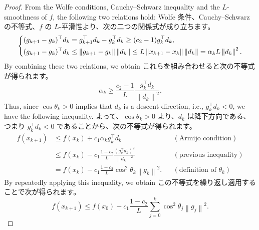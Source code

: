 \documentclass[0_main]{subfiles}
\begin{document}
\begin{proof}
    \ifEn
        From the Wolfe conditions, Cauchy--Schwarz inequality and the $L$-smoothness of $f$, the following two relations hold:
    \else
        Wolfe 条件、Cauchy--Schwarzの不等式、$f$ の $L$-平滑性より、次の二つの関係式が成り立ちます。
    \fi
    \begin{equation*}
        \begin{dcases}
            (g_{k+1} - g_k)^\top d_k = g_{k+1}^\top d_k - g_k^\top d_k
            \geq (c_2 - 1) g_k^\top d_k, \\
            (g_{k+1} - g_k)^\top d_k \leq
            \left\lVert g_{k+1} - g_k \right\rVert \left\lVert d_k \right\rVert \leq L \left\lVert x_{k+1} - x_k \right\rVert \left\lVert d_k \right\rVert  = \alpha_k L \left\lVert d_k \right\rVert^2.
        \end{dcases}
    \end{equation*}
    \ifEn
        By combining these two relations, we obtain
    \else
        これらを組み合わせると次の不等式が得られます。
    \fi
    \begin{equation*}
        \alpha_k \geq \frac{c_2 - 1}{L} \frac{g_k^\top d_k}{\left\lVert d_k \right\rVert^2}.
    \end{equation*}
    \ifEn
        Thus, since $\cos \theta_k > 0$ implies that $d_k$ is a descent direction, i.e., $g_k^\top d_k < 0$, we have the following inequality.
    \else
        よって、$\cos \theta_k > 0$ より、$d_k$ は降下方向である、つまり $g_k^\top d_k < 0$ であることから、次の不等式が得られます。
    \fi
    \begin{align*}
        f(x_{k+1}) & \leq f(x_k) + c_1 \alpha_k g_k^\top d_k                                                     &  & (\text{Armijo condition})         \\
                   & \leq f(x_k) - c_1 \frac{1 - c_2}{L} \frac{(g_k^\top d_k)^2}{\left\lVert d_k \right\rVert^2} &  & (\text{previous inequality})      \\
                   & = f(x_k) - c_1 \frac{1 - c_2}{L} \cos^2 \theta_k \left\lVert g_k \right\rVert^2.            &  & (\text{definition of $\theta_k$})
    \end{align*}
    \ifEn
        By repeatedly applying this inequality, we obtain
    \else
        この不等式を繰り返し適用することで次が得られます。
    \fi
    \begin{equation*}
        f(x_{k+1}) \leq f(x_0) - c_1 \frac{1 - c_2}{L} \sum_{j=0}^k \cos^2 \theta_j \left\lVert g_j \right\rVert^2.
    \end{equation*}

\end{proof}
\end{document}
